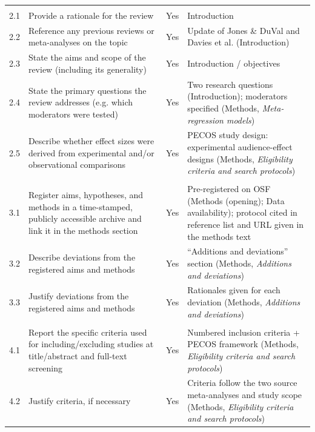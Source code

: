 \begin{longtable}{@{}p{0.9cm} p{5.5cm} p{1.4cm} p{6.0cm}@{}}
\addlinespace
\multicolumn{4}{@{}l}{\textbf{Aims and questions}}\\
2.1 & Provide a rationale for the review & Yes & Introduction \\
2.2 & Reference any previous reviews or meta-analyses on the topic & Yes & Update of Jones \& DuVal and Davies et al. (Introduction) \\
2.3 & State the aims and scope of the review (including its generality) & Yes & Introduction / objectives \\
2.4 & State the primary questions the review addresses (e.g. which moderators were tested) & Yes & Two research questions (Introduction); moderators specified (Methods, \emph{Meta-regression models}) \\
2.5 & Describe whether effect sizes were derived from experimental and/or observational comparisons & Yes & PECOS study design: experimental audience-effect designs (Methods, \emph{Eligibility criteria and search protocols}) \\

\addlinespace
\multicolumn{4}{@{}l}{\textbf{Review registration}}\\
3.1 & Register aims, hypotheses, and methods in a time-stamped, publicly accessible archive and link it in the methods section & Yes & Pre-registered on OSF (Methods (opening); Data availability); protocol cited in reference list and URL given in the methods text \\
3.2 & Describe deviations from the registered aims and methods & Yes & ``Additions and deviations'' section (Methods, \emph{Additions and deviations}) \\
3.3 & Justify deviations from the registered aims and methods & Yes & Rationales given for each deviation (Methods, \emph{Additions and deviations}) \\

\addlinespace
\multicolumn{4}{@{}l}{\textbf{Eligibility criteria}}\\
4.1 & Report the specific criteria used for including/excluding studies at title/abstract and full-text screening & Yes & Numbered inclusion criteria + PECOS framework (Methods, \emph{Eligibility criteria and search protocols}) \\
4.2 & Justify criteria, if necessary & Yes & Criteria follow the two source meta-analyses and study scope (Methods, \emph{Eligibility criteria and search protocols}) \\


\end{longtable}
